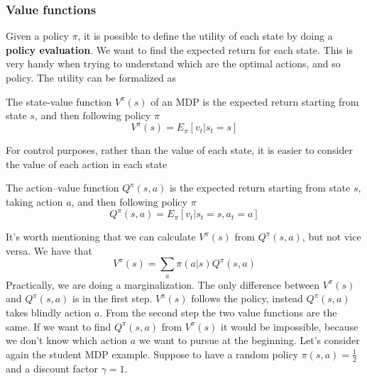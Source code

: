 \documentclass[main.tex]{subfiles}
\begin{document}
\subsubsection{Value functions}
Given a policy $\pi$, it is possible to define the utility of each state by doing a \textbf{policy evaluation}. We want to find the expected return for each state. This is very handy when trying to understand which are the optimal actions, and so policy. The utility can be formalized as
\begin{definition}
The state-value function $V^{\pi}(s)$ of an MDP is the expected return starting from state $s$, and then following policy $\pi$
\begin{equation*}
    V^{\pi}(s) = E_{\pi}[v_t|s_t=s]
\end{equation*}
\end{definition}
For control purposes, rather than the value of each state, it is easier to consider the value of each action in each state
\begin{definition}
The action–value function $Q^\pi(s, a)$ is the expected return starting from state $s$, taking action $a$,
and then following policy $\pi$
\begin{equation*}
    Q^{\pi}(s,a) = E_{\pi}[v_t|s_t=s, a_t=a]
\end{equation*}
\end{definition}
It's worth mentioning that we can calculate $V^{\pi}(s)$ from $Q^{\pi}(s, a)$, but not vice versa. We have that
\begin{equation}
    V^{\pi}(s) = \sum_a \pi(a|s) Q^{\pi}(s,a)
\end{equation}
Practically, we are doing a marginalization\footnotemark. The only difference between $V^{\pi}(s)$ and $Q^{\pi}(s, a)$ is in the first step. $V^{\pi}(s)$ follows the policy, instead $Q^{\pi}(s, a)$ takes blindly action $a$. From the second step the two value functions are the same. If we want to find $Q^{\pi}(s, a)$ from $V^{\pi}(s)$ it would be impossible, because we don't know which action $a$ we want to pursue at the beginning.
Let's consider again the student MDP example. Suppose to have a random policy $\pi(s,a)=\frac{1}{2}$ \footnotemark{} and a discount factor $\gamma=1$.
\end{document}
